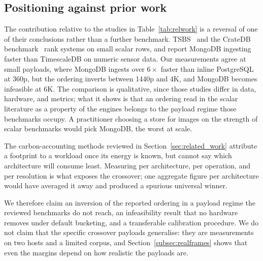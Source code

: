 \documentclass[pdflatex,sn-basic]{sn-jnl}%
\begin{document}
\subsection{Positioning against prior work}
{\color{markup}The contribution relative to the studies in Table~\ref{tab:relwork} is a reversal of one of their conclusions rather than a further benchmark.} TSBS~\citep{tsbs} and the CrateDB benchmark~\citep{cratedb_ts_benchmark} rank systems on small scalar rows, and \citet{diva_timescaledb_mongodb_eval} report MongoDB ingesting faster than TimescaleDB on numeric sensor data. {\color{markup}Our measurements agree at small payloads, where MongoDB ingests over $6\times$ faster than inline PostgreSQL at 360p, but the ordering inverts between 1440p and 4K, and MongoDB becomes infeasible at 6K.} {\color{markup}The comparison is qualitative, since those studies differ in data, hardware, and metrics; what it shows is that an ordering read in the scalar literature as a property of the engines belongs to the payload regime those benchmarks occupy.} {\color{markup}A practitioner choosing a store for images on the strength of scalar benchmarks would pick MongoDB, the worst at scale.}

{\color{markup}The carbon-accounting methods reviewed in Section~\ref{sec:related_work} attribute a footprint to a workload once its energy is known, but cannot say which architecture will consume least.} {\color{markup}Measuring per architecture, per operation, and per resolution is what exposes the crossover; one aggregate figure per architecture would have averaged it away and produced a spurious universal winner.}

{\color{markup}We therefore claim an inversion of the reported ordering in a payload regime the reviewed benchmarks do not reach, an infeasibility result that no hardware removes under default bucketing, and a transferable calibration procedure.} {\color{markup}We do not claim that the specific crossover payloads generalise: they are measurements on two hosts and a limited corpus, and Section~\ref{subsec:realframes} shows that even the margins depend on how realistic the payloads are.}
\end{document}
